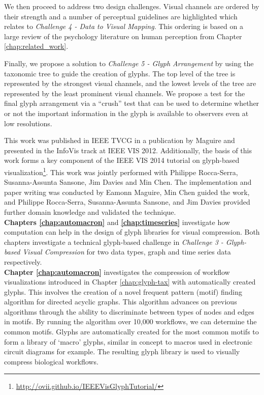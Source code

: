 We then proceed to address two design challenges.
Visual channels are ordered by their strength and a number of perceptual guidelines are highlighted which relates to \emph{Challenge 4 - Data to Visual Mapping}.
This ordering is based on a large review of the psychology literature on human perception from Chapter \ref{chap:related_work}.

Finally, we propose a solution to \emph{Challenge 5 - Glyph Arrangement} by using the taxonomic tree to guide the creation of glyphs.
The top level of the tree is represented by the strongest visual channels, and the lowest levels of the tree are represented by the least prominent visual channels.
We propose a test for the final glyph arrangement via a ``crush'' test that can be used to determine whether or not the important information in the glyph is available to observers even at low resolutions.


This work was published in IEEE TVCG in a publication by Maguire \etal \cite{Maguire:2012:TVCG} and presented in the InfoVis track at IEEE VIS 2012.
Additionally, the basis of this work forms a key component of the IEEE VIS 2014 tutorial on glyph-based visualization\footnote{\url{http://ovii.github.io/IEEEVisGlyphTutorial/}}. 
This work was jointly performed with Philippe Rocca-Serra, Susanna-Assunta Sansone, Jim Davies and Min Chen.  
The implementation and paper writing was conducted by Eamonn Maguire, Min Chen guided the work, and Philippe Rocca-Serra, Susanna-Assunta Sansone, and Jim Davies provided further domain knowledge and validated the technique.\\

\textbf{Chapters \ref{chap:automacron}} and \textbf{\ref{chap:timeseries}} investigate how computation can help in the design of glyph libraries for visual compression.
Both chapters investigate a technical glyph-based challenge in \emph{Challenge 3 - Glyph-based Visual Compression} for two data types, graph and time series data respectively.\\

\textbf{Chapter \ref{chap:automacron}} investigates the compression of workflow visualizations introduced in Chapter \ref{chap:glyph-tax} with automatically created glyphs.
This involves the creation of a novel frequent pattern (motif) finding algorithm for directed acyclic graphs.
This algorithm advances on previous algorithms through the ability to discriminate between types of nodes and edges in motifs.
By running the algorithm over 10,000 workflows, we can determine the common motifs.
Glyphs are automatically created for the most common motifs to form a library of `macro' glyphs, similar in concept to macros used in electronic circuit diagrams for example.
The resulting glyph library is used to visually compress biological workflows. 

